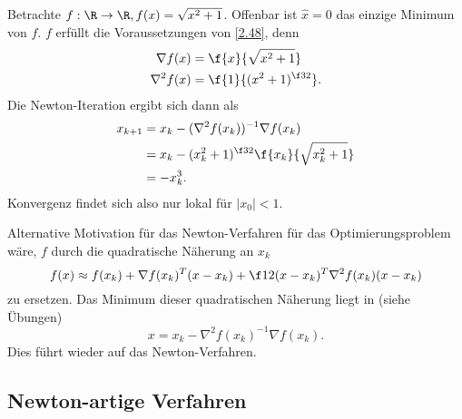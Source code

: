 \begin{ex} \label{2.49}
	Betrachte $f: \R \to \R, f(x) = \sqrt{x^2 + 1}$.
	Offenbar ist $\hat x=0$ das einzige Minimum von $f$.
	$f$ erfüllt die Voraussetzungen von \ref{2.48}, denn
	\begin{align*}
		\nabla f(x) &= \f {x}{\sqrt{x^2 + 1}} \\
		\nabla^2 f(x) &= \f {1}{(x^2 + 1)^{\f 32}}.
	\end{align*}
	Die Newton-Iteration ergibt sich dann als
	\begin{align*}
		x_{k+1}
		&= x_k - (\nabla^2 f(x_k))^{-1} \nabla f(x_k) \\
		&= x_k - (x_k^2 + 1)^{\f 32} \f {x_k}{\sqrt{x_k^2 + 1}} \\
		&= - x_k^3.
	\end{align*}
	Konvergenz findet sich also nur lokal für $|x_0| < 1$.
\end{ex}

\begin{nt} \label{2.50}
	Alternative Motivation für das Newton-Verfahren für das Optimierungsproblem wäre, $f$ durch die quadratische Näherung an $x_k$
	\[
		f(x) \approx
		f(x_k) + \nabla f(x_k)^T (x-x_k) + \f 12 (x-x_k)^T \nabla^2 f(x_k) (x-x_k)
	\]
	zu ersetzen.
	Das Minimum dieser quadratischen Näherung liegt in (siehe Übungen) %
	\[
		x = x_k - \nabla^2 f(x_k)^{-1} \nabla f(x_k).
	\]
	Dies führt wieder auf das Newton-Verfahren.
\end{nt}

\subsection{Newton-artige Verfahren}

